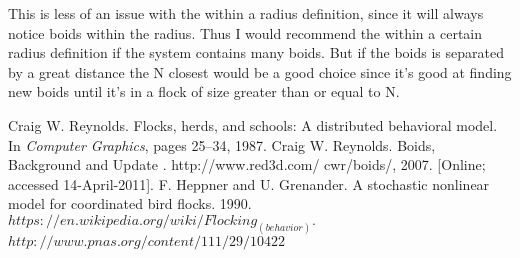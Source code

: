 \documentclass[a4paper]{article}
\begin{document}
This is less of an issue with the within a radius definition, since it will always
notice boids within the radius. Thus I would recommend the within a certain radius
definition if the system contains many boids. But if the boids is separated by a great
distance the N closest would be a good choice since it’s good at finding new boids
until it’s in a flock of size greater than or equal to N.
\begin{thebibliography}{9}
  Craig W. Reynolds. Flocks, herds, and schools: A distributed behavioral model.
In \textit{Computer Graphics}, pages 25–34, 1987.
 Craig W. Reynolds. Boids, Background and Update . http://www.red3d.com/
cwr/boids/, 2007. [Online; accessed 14-April-2011].
F. Heppner and U. Grenander. A stochastic nonlinear model for coordinated
bird flocks. 1990.
$https://en.wikipedia.org/wiki/Flocking_(behavior).$
$http://www.pnas.org/content/111/29/10422$
\end{thebibliography}
\end{document}
